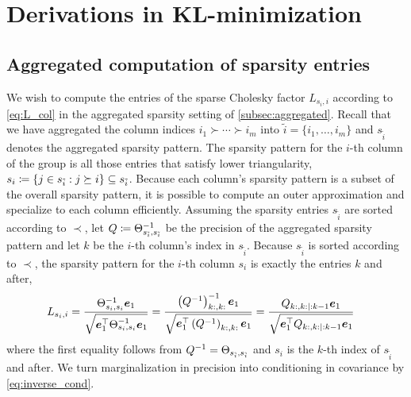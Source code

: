 \documentclass[review,supplement,onefignum,onetabnum]{siamonline220329}
\begin{document}
\maketitle

\section{Derivations in KL-minimization}

\subsection{Aggregated computation of sparsity entries}
\label{app:L_mult}

We wish to compute the entries of the sparse Cholesky factor
\( L_{s_i, i} \) according to \cref{eq:L_col} in the aggregated
sparsity setting of \cref{subsec:aggregated}.
Recall that we have aggregated the column indices \( i_1 \succ
\dotsb \succ i_m \) into \( \tilde{i} = \{ i_1, \dotsc, i_m \} \)
and \( s_{\tilde{i}} \) denotes the aggregated sparsity pattern.
The sparsity pattern for the \( i \)-th column of the group is all
those entries that satisfy lower triangularity, \( s_i \coloneqq \{
j \in s_{\tilde{i}} : j \succeq i \} \subseteq s_{\tilde{i}} \).
Because each column's sparsity pattern is a subset of the
overall sparsity pattern, it is possible to compute an outer
approximation and specialize to each column efficiently.
Assuming the sparsity entries \( s_{\tilde{i}} \) are sorted according to
\( \prec \), let \( Q \coloneqq \Theta_{s_{\tilde{i}}, s_{\tilde{i}}}^{-1} \) be
the precision of the aggregated sparsity pattern and let \( k \) be the \(
i \)-th column's index in \( s_{\tilde{i}} \).
Because \( s_{\tilde{i}} \) is sorted according to \(
\prec \), the sparsity pattern for the \( i \)-th column
\( s_i \) is exactly the entries \( k \) and after,
\begin{align}
  \label{eq:L_precision}
  L_{s_i, i}
   &= \frac{\CM_{s_i, s_i}^{-1} \vec{e}_1}
           {\sqrt{\vec{e}_1^{\top} \CM_{s_i, s_i}^{-1} \vec{e}_1}}
    = \frac{\left (Q^{-1} \right )_{k:, k:}^{-1} \vec{e}_1}
           {\sqrt{\vec{e}_1^{\top} \left (Q^{-1} \right )_{k:, k:} \vec{e}_1}}
    = \frac{Q_{k:, k: \mid :k - 1} \vec{e}_1}
           {\sqrt{\vec{e}_1^{\top} Q_{k:, k: \mid :k - 1} \vec{e}_1}}
\end{align}
where the first equality follows from \( Q^{-1} =
\Theta_{s_{\tilde{i}}, s_{\tilde{i}}} \) and \( s_i \) is
the \( k \)-th index of \( s_{\tilde{i}} \) and after.
We turn marginalization in precision into
conditioning in covariance by \cref{eq:inverse_cond}.
\end{document}
